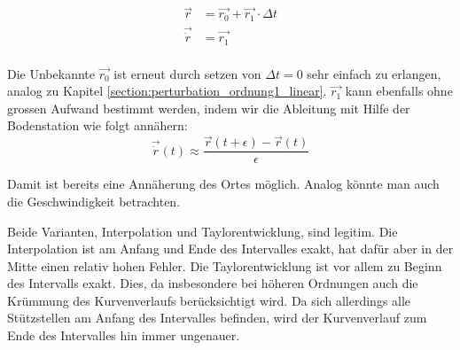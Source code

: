 \begin{equation}
\label{eq:ordnung1_taylor_ansatz}
\begin{aligned}
\vec{r} &=  \vec{r_0} + \vec{r_1} \cdot \Delta t \\
\vec{\dot{r}} &= \vec{r_1} \\
\end{aligned}
\end{equation}

Die Unbekannte $\vec{r_0}$ ist erneut durch setzen von $\Delta t = 0$ sehr einfach zu erlangen, analog zu Kapitel \ref{section:perturbation_ordnung1_linear}. $\vec{r_1}$ kann ebenfalls ohne grossen Aufwand bestimmt werden, indem wir die Ableitung mit Hilfe der Bodenstation wie folgt annähern:
\[
\vec{\dot{r}}(t) \approx \frac{\vec{r}(t+\epsilon) - \vec{r}(t)}{\epsilon}
\]

Damit ist bereits eine Annäherung des Ortes möglich. Analog könnte man auch die Geschwindigkeit betrachten.

Beide Varianten, Interpolation und Taylorentwicklung, sind legitim. Die Interpolation ist am Anfang und Ende des Intervalles exakt, hat dafür aber in der Mitte einen relativ hohen Fehler. Die Taylorentwicklung ist vor allem zu Beginn des Intervalls exakt. Dies, da insbesondere bei höheren Ordnungen auch die Krümmung des Kurvenverlaufs berücksichtigt wird. Da sich allerdings alle Stützstellen am Anfang des Intervalles befinden, wird der Kurvenverlauf zum Ende des Intervalles hin immer ungenauer.
